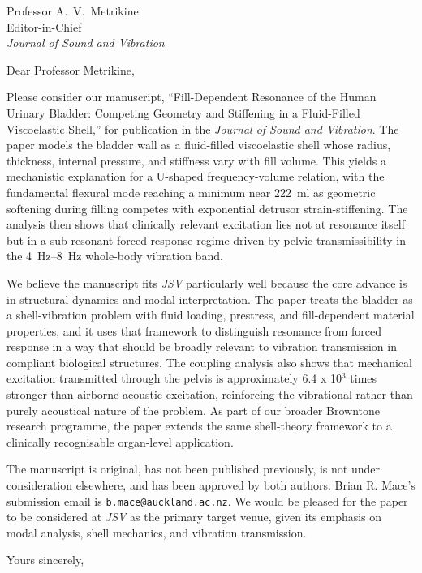 \documentclass[11pt]{letter}
\date{\today}
\begin{document}
\begin{letter}{%
Professor A.\ V.\ Metrikine\\
Editor-in-Chief\\
\textit{Journal of Sound and Vibration}}

\opening{Dear Professor Metrikine,}
\small

Please consider our manuscript, ``Fill-Dependent Resonance of the Human Urinary Bladder: Competing Geometry and Stiffening in a Fluid-Filled Viscoelastic Shell,'' for publication in the \textit{Journal of Sound and Vibration}. The paper models the bladder wall as a fluid-filled viscoelastic shell whose radius, thickness, internal pressure, and stiffness vary with fill volume. This yields a mechanistic explanation for a U-shaped frequency-volume relation, with the fundamental flexural mode reaching a minimum near \SI{222}{\milli\litre} as geometric softening during filling competes with exponential detrusor strain-stiffening. The analysis then shows that clinically relevant excitation lies not at resonance itself but in a sub-resonant forced-response regime driven by pelvic transmissibility in the \SIrange{4}{8}{\hertz} whole-body vibration band.

We believe the manuscript fits \textit{JSV} particularly well because the core advance is in structural dynamics and modal interpretation. The paper treats the bladder as a shell-vibration problem with fluid loading, prestress, and fill-dependent material properties, and it uses that framework to distinguish resonance from forced response in a way that should be broadly relevant to vibration transmission in compliant biological structures. The coupling analysis also shows that mechanical excitation transmitted through the pelvis is approximately 6.4 x 10$^3$ times stronger than airborne acoustic excitation, reinforcing the vibrational rather than purely acoustical nature of the problem. As part of our broader Browntone research programme, the paper extends the same shell-theory framework to a clinically recognisable organ-level application.

The manuscript is original, has not been published previously, is not under consideration elsewhere, and has been approved by both authors. Brian R. Mace's submission email is \texttt{b.mace@auckland.ac.nz}. We would be pleased for the paper to be considered at \textit{JSV} as the primary target venue, given its emphasis on modal analysis, shell mechanics, and vibration transmission.

\closing{Yours sincerely,}

\end{letter}
\end{document}
